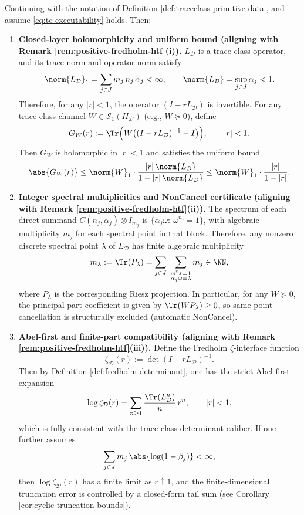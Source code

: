 \begin{theorem}\label{thm:cyclic-fredholm-witt}
Continuing with the notation of Definition \ref{def:traceclass-primitive-data}, and assume \eqref{eq:tc-executability} holds. Then:
\begin{enumerate}
  \item \textbf{Closed-layer holomorphicity and uniform bound (aligning with Remark \ref{rem:positive-fredholm-htf}(i)).}
  \(L_{\mathcal D}\) is a trace-class operator, and its trace norm and operator norm satisfy
  \[
  \norm{L_{\mathcal D}}_1=\sum_{j\in J} m_j\,n_j\,\alpha_j<\infty,
  \qquad
  \norm{L_{\mathcal D}}=\sup_{j\in J}\alpha_j<1.
  \]
  Therefore, for any \(|r|<1\), the operator \((I-rL_{\mathcal D})\) is invertible.
  For any trace-class channel \(W\in\mathcal{S}_1(H_{\mathcal D})\) (e.g., \(W\succeq 0\)), define
  \[
  G_W(r):=\Tr\Bigl(W\bigl((I-rL_{\mathcal D})^{-1}-I\bigr)\Bigr),\qquad |r|<1.
  \]
  Then \(G_W\) is holomorphic in \(|r|<1\) and satisfies the uniform bound
  \[
  \abs{G_W(r)}
  \le
  \norm{W}_1\cdot\frac{|r|\,\norm{L_{\mathcal D}}}{1-|r|\,\norm{L_{\mathcal D}}}
  \le
  \norm{W}_1\cdot\frac{|r|}{1-|r|}.
  \]

  \item \textbf{Integer spectral multiplicities and NonCancel certificate (aligning with Remark \ref{rem:positive-fredholm-htf}(ii)).}
  The spectrum of each direct summand \(C(n_j,\alpha_j)\otimes I_{m_j}\) is
  \(
  \{\alpha_j\omega:\ \omega^{n_j}=1\}
  \), with algebraic multiplicity \(m_j\) for each spectral point in that block.
  Therefore, any nonzero discrete spectral point \(\lambda\) of \(L_{\mathcal D}\) has finite algebraic multiplicity
  \[
  m_\lambda:=\Tr(P_\lambda)
  =
  \sum_{j\in J}\ \sum_{\substack{\omega^{n_j}=1\\ \alpha_j\omega=\lambda}} m_j
  \in\NN,
  \]
  where \(P_\lambda\) is the corresponding Riesz projection.
  In particular, for any \(W\succeq 0\), the principal part coefficient is given by \(\Tr(WP_\lambda)\ge 0\),
  so same-point cancellation is structurally excluded (automatic NonCancel).

  \item \textbf{Abel-first and finite-part compatibility (aligning with Remark \ref{rem:positive-fredholm-htf}(iii)).}
  Define the Fredholm \(\zeta\)-interface function
  \[
  \zeta_{\mathcal D}(r):=\det(I-rL_{\mathcal D})^{-1}.
  \]
  Then by Definition \ref{def:fredholm-determinant}, one has the strict Abel-first expansion
  \[
  \log \zeta_{\mathcal D}(r)=\sum_{n\ge 1}\frac{\Tr(L_{\mathcal D}^n)}{n}\,r^n,\qquad |r|<1,
  \]
  which is fully consistent with the trace-class determinant caliber.
  If one further assumes
  \begin{equation}\label{eq:fp-summability}
  \sum_{j\in J} m_j\,\abs{\log(1-\beta_j)}<\infty,
  \end{equation}
  then \(\log \zeta_{\mathcal D}(r)\) has a finite limit as \(r\uparrow 1\), and the finite-dimensional truncation error is controlled by a closed-form tail sum (see Corollary \ref{cor:cyclic-truncation-bounds}).
\end{enumerate}
\end{theorem}

